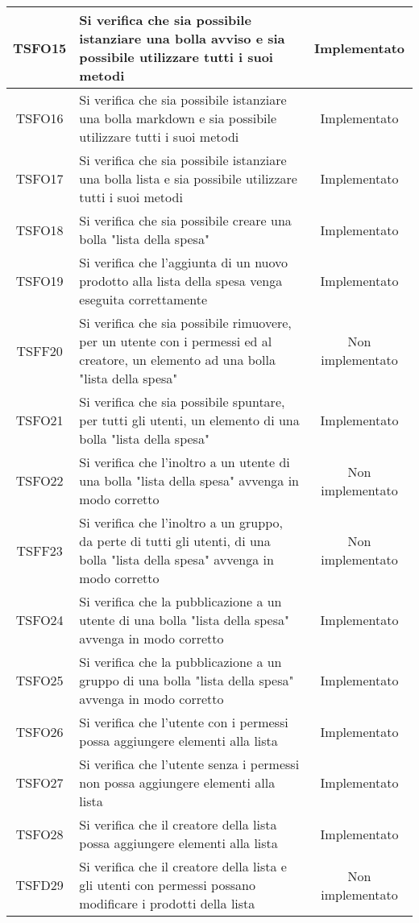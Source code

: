 \begin{center}
\begin{longtable}{|c|>{\centering}m{10cm}|c|}
		TSFO15 & Si verifica che sia possibile istanziare una bolla avviso e sia possibile utilizzare tutti i suoi metodi & Implementato \\ \hline
		TSFO16 & Si verifica che sia possibile istanziare una bolla markdown e sia possibile utilizzare tutti i suoi metodi & Implementato \\ \hline
		TSFO17 & Si verifica che sia possibile istanziare una bolla lista e sia possibile utilizzare tutti i suoi metodi & Implementato \\ \hline
		TSFO18 & Si verifica che sia possibile creare una bolla "lista della spesa" & Implementato \\ \hline
		TSFO19 & Si verifica che l'aggiunta di un nuovo prodotto alla lista della spesa venga eseguita correttamente & Implementato \\ \hline
		TSFF20 & Si verifica che sia possibile rimuovere, per un utente con i permessi ed al creatore, un elemento ad una bolla "lista della spesa" & Non implementato \\ \hline
		TSFO21 & Si verifica che sia possibile spuntare, per tutti gli utenti, un elemento di una bolla "lista della spesa" & Implementato \\ \hline
		TSFO22 & Si verifica che l'inoltro a un utente di una bolla "lista della spesa" avvenga in modo corretto & Non implementato \\ \hline
		TSFF23 & Si verifica che l'inoltro a un gruppo, da perte di tutti gli utenti, di una bolla "lista della spesa" avvenga in modo corretto & Non implementato \\ \hline
		TSFO24 & Si verifica che la pubblicazione a un utente di una bolla "lista della spesa" avvenga in modo corretto & Implementato \\ \hline
		TSFO25 & Si verifica che la pubblicazione a un gruppo di una bolla "lista della spesa" avvenga in modo corretto & Implementato \\ \hline
		TSFO26 & Si verifica che l'utente con i permessi possa aggiungere elementi alla lista & Implementato \\ \hline
		TSFO27 & Si verifica che l'utente senza i permessi non possa aggiungere elementi alla lista & Implementato \\ \hline
		TSFO28 & Si verifica che il creatore della lista possa aggiungere elementi alla lista & Implementato \\ \hline
		TSFD29 & Si verifica che il creatore della lista e gli utenti con permessi possano modificare i prodotti della lista & Non implementato \\ \hline
	\end{longtable}
\end{center}
